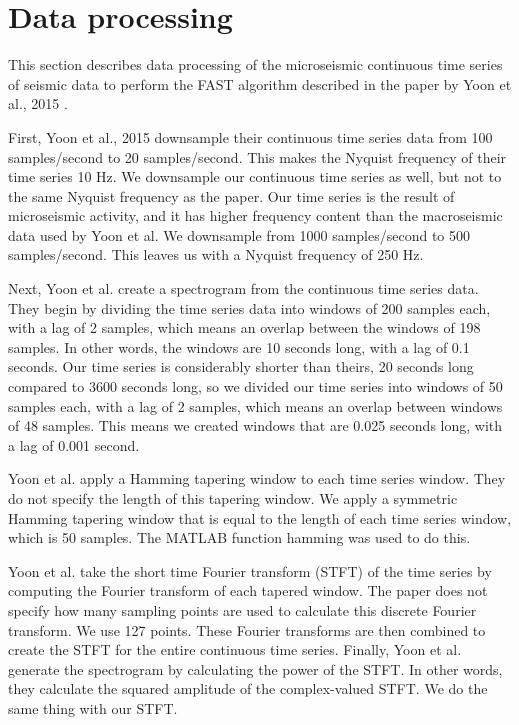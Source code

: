 \section{Data processing}
This section describes data processing of the microseismic continuous time series of seismic data to perform the FAST algorithm described in the paper by Yoon et al., 2015 \cite{yoon2015earthquake}. 

First, Yoon et al., 2015 downsample their continuous time series data from 100 samples/second to 20 samples/second. This makes the Nyquist frequency of their time series 10 Hz. We downsample our continuous time series as well, but not to the same Nyquist frequency as the paper. Our time series is the result of microseismic activity, and it has higher frequency content than the macroseismic data used by Yoon et al. We downsample from 1000 samples/second to 500 samples/second. This leaves us with a Nyquist frequency of 250 Hz. 

Next, Yoon et al. create a spectrogram from the continuous time series data. They begin by dividing the time series data into windows of 200 samples each, with a lag of 2 samples, which means an overlap between the windows of 198 samples. In other words, the windows are 10 seconds long, with a lag of 0.1 seconds. Our time series is considerably shorter than theirs, 20 seconds long compared to 3600 seconds long, so we divided our time series into windows of 50 samples each, with a lag of 2 samples, which means an overlap between windows of 48 samples. This means we created windows that are 0.025 seconds long, with a lag of 0.001 second. 

Yoon et al. apply a Hamming tapering window to each time series window. They do not specify the length of this tapering window. We apply a symmetric Hamming tapering window that is equal to the length of each time series window, which is 50 samples. The MATLAB function hamming was used to do this.

Yoon et al. take the short time Fourier transform (STFT) of the time series by computing the Fourier transform of each tapered window. The paper does not specify how many sampling points are used to calculate this discrete Fourier transform. We use 127 points. These Fourier transforms are then combined to create the STFT for the entire continuous time series.
Finally, Yoon et al. generate the spectrogram by calculating the power of the STFT. In other words, they calculate the squared amplitude of the complex-valued STFT. We do the same thing with our STFT.

